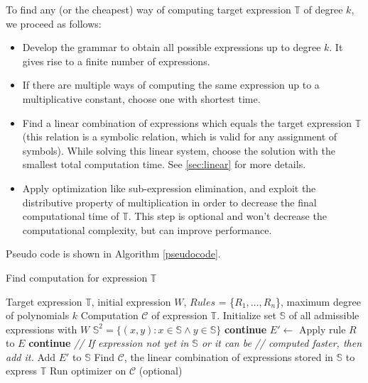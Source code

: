 To find any (or the cheapest) way of computing target expression $\mathbb{T}$ of degree $k$, we proceed as follows: 
\begin{itemize}
\item Develop the grammar to obtain all possible expressions up to degree
  $k$. It gives rise to a finite number of expressions. 
\item If there are multiple ways of computing the same expression up
  to a multiplicative constant, choose one with shortest time.
\item Find a linear combination of expressions which equals the target
  expression $\mathbb{T}$ (this relation is a symbolic relation, which
  is valid for any assignment of symbols). While solving this linear
  system, choose the solution with the smallest total computation
  time. See \ref{sec:linear} for more details.
\item Apply optimization like sub-expression elimination, and exploit
  the distributive property of multiplication in order to decrease the
  final computational time of $\mathbb{T}$. This step is optional and
  won't decrease the computational complexity, but can improve
  performance.
\end{itemize}

Pseudo code is shown in Algorithm \ref{pseudocode}.

\begin{algorithm}[t]
\caption{Find computation for expression $\mathbb{T}$}
\begin{algorithmic} 
\REQUIRE Target expression $\mathbb{T}$, initial expression $W$, $Rules$ = \{$R_1, \dots, R_n$\}, maximum degree of polynomials $k$
\ENSURE Computation $\mathcal{C}$ of expression $\mathbb{T}$.
\STATE Initialize set $\mathbb{S}$ of all admissible expressions with $W$
\STATE $\mathbb{S}^2 = \{ (x, y) : x \in \mathbb{S} \land y \in \mathbb{S}\}$ 
\STATE \textbf{continue}
\ENDIF
\STATE $E' \gets$ Apply rule $R$ to $E$
  \STATE \textbf{continue}
\ENDIF
\STATE \emph{// If expression not yet in $\mathbb{S}$ or it can be}
\STATE \emph{// computed faster, then add it.}
  \STATE Add $E'$ to $\mathbb{S}$
\ENDIF
\ENDFOR
\ENDFOR
\ENDWHILE
\STATE Find $\mathcal{C}$, the linear combination of expressions stored in $\mathbb{S}$ to express $\mathbb{T}$
\STATE Run optimizer on $\mathcal{C}$ (optional)
\end{algorithmic}
\label{pseudocode}
\end{algorithm}


